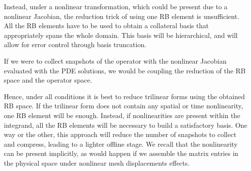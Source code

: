 \documentclass[../../thesis.tex]{subfiles}
\newcommand{\inner}[2]{\left<#1, #2\right>}
\newcommand{\Ah}[1]{\ensuremath{\vb{#1}^{n+1}_h}}
\begin{document}
Instead, under a nonlinear transformation, 
which could be present due to a nonlinear Jacobian,
the reduction trick of using one RB element is unsufficient.
All the RB elements have to be used to obtain a collateral basis that appropriately spans the whole domain.
This basis will be hierarchical, and will allow for error control through basis truncation.

If we were to collect snapshots of the operator with the nonlinear Jacobian evaluated with the PDE solutions,
we would be coupling the reduction of the RB space and the operator space.

Hence, under all conditions it is best to reduce trilinear forms using the obtained RB space.
If the trilinear form does not contain any spatial or time nonlinearity, one RB element will be enough.
Instead, if nonlinearities are present within the integrand, all the RB elements will be necessary 
to build a satisfactory basis.
One way or the other, this approach will reduce the number of snapshots to collect and compress,
leading to a lighter offline stage.
We recall that the nonlinearity can be present implicitly, 
as would happen if we assemble the matrix entries in the physical space under nonlinear mesh displacements effects.


\end{document}

